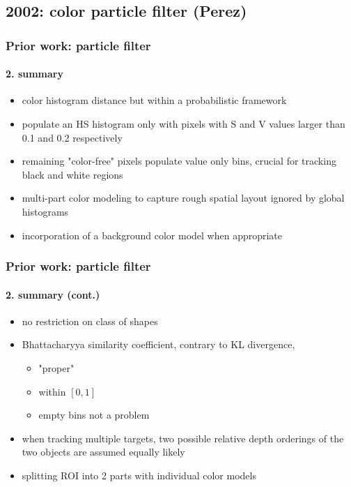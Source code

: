 \subsection{2002: color particle filter (Perez)}
\begin{frame}
\frametitle{Prior work: particle filter}
\framesubtitle{2. summary}
\mypagenum
	\begin{itemize}
		\item color histogram distance but within a probabilistic framework
		\item populate an HS histogram only with pixels with S and V values larger than 0.1 and 0.2 respectively
		\item remaining "color-free" pixels populate value only bins, crucial for tracking black and white regions
		\item multi-part color modeling to capture rough spatial layout ignored by global histograms
		\item incorporation of a background color model when appropriate
	\end{itemize}
\end{frame}



\begin{frame}
\frametitle{Prior work: particle filter}
\framesubtitle{2. summary (cont.)}
\mypagenum
	\begin{itemize}
		\item no restriction on class of shapes
		\item Bhattacharyya similarity coefficient, contrary to KL divergence,
			\begin{itemize}
				\item "proper"
				\item within $[0,1]$
				\item empty bins not a problem
			\end{itemize}
		\item when tracking multiple targets, two possible relative depth orderings of the two objects are assumed equally likely
		\item splitting ROI into {\color{blue}2} parts with individual color models
	\end{itemize}
\end{frame}